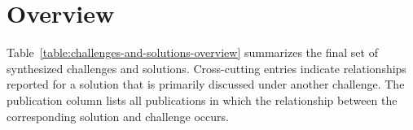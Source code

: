 \section{Overview}

Table~\ref{table:challenges-and-solutions-overview} summarizes the final set of synthesized challenges and solutions. Cross-cutting entries indicate relationships reported for a solution that is primarily discussed under another challenge. The publication column lists all publications in which the relationship between the corresponding solution and challenge occurs.

\begingroup
\footnotesize

\newcommand{\tablechallengeref}[2]{%
    \hyperref[challenge:#1]{#2}%
}
\newcommand{\tablesolutionref}[2]{%
    \hyperref[solution:#1]{#2}%
}
\newcommand{\tablecrosscuttingsolutionref}[2]{%
    \hyperref[solution:#1]{\textit{Cross-cutting:} #2}%
}
\newcommand{\tablesolutionrule}{%
    \cline{3-4}\noalign{\nobreak}%
}

\setlength{\tabcolsep}{2pt}
\renewcommand{\arraystretch}{0.95}

\setlength{\LTpre}{2pt}
\setlength{\LTpost}{2pt}

\captionsetup{skip=3pt}

